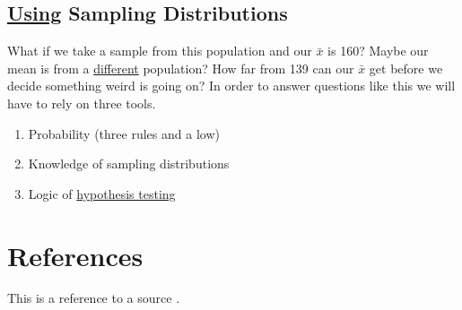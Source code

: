 \documentclass[11pt]{report}
\begin{document}
\subsection{\underline{Using} Sampling Distributions}
What if we take a sample from this population and our $\bar{x}$ is 160? Maybe our mean is from a \underline{different} population?
How far from 139 can our $\bar{x}$ get before we decide something weird is going on? In order to answer questions like this we will have to rely on three tools. \newline 
\begin{enumerate}
    \item Probability (three rules and a low)
    \item Knowledge of sampling distributions
    \item Logic of \underline{hypothesis testing}
\end{enumerate}

\section{References}
This is a reference to a source \cite{example}.



\end{document}
